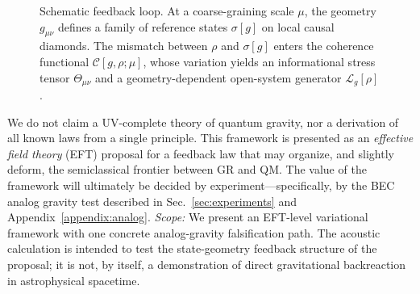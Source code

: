 \documentclass[aps,prd,twocolumn,superscriptaddress,nofootinbib,floatfix]{revtex4-2}
\newcommand{\Cfunc}{\mathcal{C}}
\newcommand{\Tmn}{\Theta_{\mu\nu}}
\begin{document}
\begin{figure}[t]
    \centering
    \caption{Schematic feedback loop. At a coarse-graining scale $\mu$, the geometry $g_{\mu\nu}$ defines a family of reference states $\sigma[g]$ on local causal diamonds. The mismatch between $\rho$ and $\sigma[g]$ enters the coherence functional $\Cfunc[g,\rho;\mu]$, whose variation yields an informational stress tensor $\Tmn$ and a geometry-dependent open-system generator $\mathcal{L}_g[\rho]$.}
    \label{fig:feedback-loop}
\end{figure}

We do not claim a UV-complete theory of quantum gravity, nor a derivation of all known laws from a single principle.
This framework is presented as an \emph{effective field theory} (EFT) proposal for a feedback law that may organize, and slightly deform, the semiclassical frontier between GR and QM.
The value of the framework will ultimately be decided by experiment---specifically, by the BEC analog gravity test described in Sec.~\ref{sec:experiments} and Appendix~\ref{appendix:analog}.
\emph{Scope:} We present an EFT-level variational framework with one concrete analog-gravity falsification path. The acoustic calculation is intended to test the state-geometry feedback structure of the proposal; it is not, by itself, a demonstration of direct gravitational backreaction in astrophysical spacetime.
\end{document}
